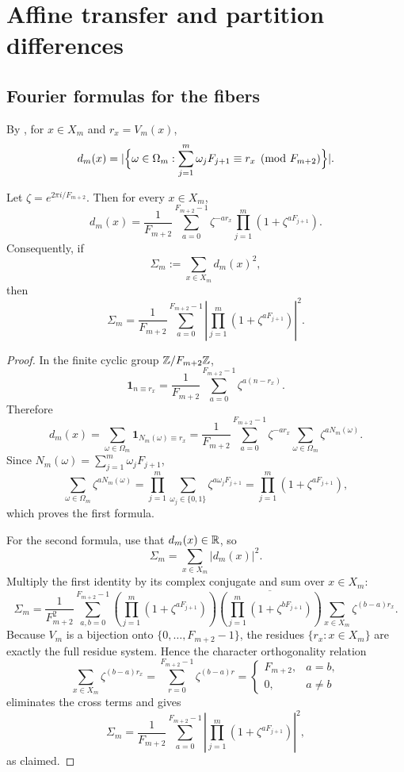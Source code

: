 \section{Affine transfer and partition differences}\label{sec:residue-affine}

\subsection{Fourier formulas for the fibers}

By , for \(x\in X_m\) and
\(r_x=V_m(x)\),
\[
 d_m(x)=\lvert \Bigl\{\omega\in\Omega_m:
 \sum_{j=1}^m\omega_jF_{j+1}\equiv r_x\pmod{F_{m+2}}\Bigr\} \rvert.
\]

\begin{theorem}
\label{thm:fourier-inversion}
Let \(\zeta=e^{2\pi i/F_{m+2}}\).  Then for every \(x\in X_m\),
\[
  d_m(x)=\frac{1}{F_{m+2}}
  \sum_{a=0}^{F_{m+2}-1}
  \zeta^{-ar_x}\prod_{j=1}^m(1+\zeta^{aF_{j+1}}).
\]
Consequently, if
\[
  \Sigma_m:=\sum_{x\in X_m}d_m(x)^2,
\]
then
\[
  \Sigma_m=
  \frac{1}{F_{m+2}}
  \sum_{a=0}^{F_{m+2}-1}
  \left|
    \prod_{j=1}^m(1+\zeta^{aF_{j+1}})
  \right|^2.
\]
\end{theorem}

\begin{proof}
In the finite cyclic group \(\mathbb{Z}/F_{m+2}\mathbb{Z}\),
\[
  \mathbf{1}_{n\equiv r_x}
  =
  \frac{1}{F_{m+2}}
  \sum_{a=0}^{F_{m+2}-1}\zeta^{a(n-r_x)}.
\]
Therefore
\[
  d_m(x)
  =
  \sum_{\omega\in\Omega_m}\mathbf{1}_{N_m(\omega)\equiv r_x}
  =
  \frac{1}{F_{m+2}}
  \sum_{a=0}^{F_{m+2}-1}
  \zeta^{-ar_x}
  \sum_{\omega\in\Omega_m}\zeta^{aN_m(\omega)}.
\]
Since \(N_m(\omega)=\sum_{j=1}^m \omega_jF_{j+1}\),
\[
  \sum_{\omega\in\Omega_m}\zeta^{aN_m(\omega)}
  =
  \prod_{j=1}^m\sum_{\omega_j\in\{0,1\}}\zeta^{a\omega_jF_{j+1}}
  =
  \prod_{j=1}^m(1+\zeta^{aF_{j+1}}),
\]
which proves the first formula.

For the second formula, use that \(d_m(x)\in\mathbb{R}\), so
\[
  \Sigma_m=\sum_{x\in X_m}|d_m(x)|^2 .
\]
Multiply the first identity by its complex conjugate and sum over \(x\in X_m\):
\[
  \Sigma_m
  =
  \frac{1}{F_{m+2}^2}
  \sum_{a,b=0}^{F_{m+2}-1}
  \left(
    \prod_{j=1}^m(1+\zeta^{aF_{j+1}})
  \right)
  \overline{
    \left(
      \prod_{j=1}^m(1+\zeta^{bF_{j+1}})
    \right)
  }
  \sum_{x\in X_m}\zeta^{(b-a)r_x}.
\]
Because \(V_m\) is a bijection onto \(\{0,\dots,F_{m+2}-1\}\), the residues
\(\{r_x:x\in X_m\}\) are exactly the full residue system.  Hence the character
orthogonality relation
\[
  \sum_{x\in X_m}\zeta^{(b-a)r_x}
  =
  \sum_{r=0}^{F_{m+2}-1}\zeta^{(b-a)r}
  =
  \begin{cases}
    F_{m+2}, & a=b,\\
    0, & a\neq b
  \end{cases}
\]
eliminates the cross terms and gives
\[
  \Sigma_m
  =
  \frac{1}{F_{m+2}}
  \sum_{a=0}^{F_{m+2}-1}
  \left|
    \prod_{j=1}^m(1+\zeta^{aF_{j+1}})
  \right|^2,
\]
as claimed.
\end{proof}

